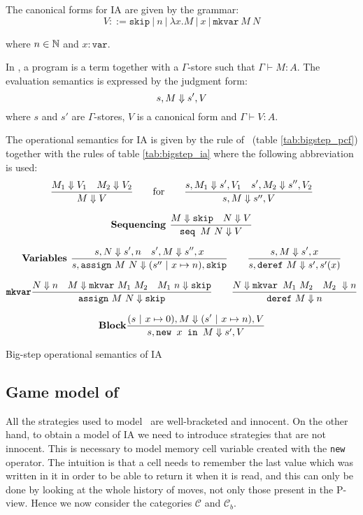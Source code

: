 The canonical forms for IA are given by the grammar:
$$ V ::= \texttt{skip}\ |\ n\ |\ \lambda x. M\ |\ x\ |\  \texttt{mkvar}\ M\ N$$

where $n \in \mathbb{N}$ and $x: \texttt{var}$.


In \ialgol, a program is a term together with a $\Gamma$-store such
that $\Gamma \vdash M : A$. The evaluation semantics is expressed by
the judgment form:
$$s,M \Downarrow s', V$$
where $s$ and $s'$ are $\Gamma$-stores, $V$ is a canonical form and $\Gamma \vdash V : A$.

The operational semantics for IA is given by the rule of \pcf\ (table \ref{tab:bigstep_pcf})
together with the rules of table \ref{tab:bigstep_ia} where the following abbreviation is used:
$$ \frac{\displaystyle M_1 \Downarrow V_1 \quad M_2 \Downarrow V_2}{M \Downarrow V} \qquad \mbox{for} \qquad
  \frac{\displaystyle s,M_1 \Downarrow s',V_1 \quad s', M_2 \Downarrow s'',V_2 }{s,M \Downarrow s'',V}
$$


\begin{table}[htbp]
$$\mbox{\textbf{Sequencing }}
    \frac{\displaystyle M \Downarrow \texttt{skip} \quad N \Downarrow V}{\texttt{seq } M\ N \Downarrow V}
$$

$$\mbox{\textbf{Variables }}
    \frac{\displaystyle s,N \Downarrow s',n \quad s',M \Downarrow s'',x}{s, \texttt{assign}\ M\ N \Downarrow (s''\ |\ x \mapsto n),\texttt{skip}}
\qquad
    \frac{\displaystyle s,M \Downarrow s',x }{s, \texttt{deref}\ M \Downarrow s',s'(x)}$$

$$\mbox{\texttt{\textbf{mkvar}}}
    \frac{\displaystyle N \Downarrow n \quad M \Downarrow \texttt{mkvar}\ M_1\ M_2 \quad M_1\ n \Downarrow \texttt{skip}}{\texttt{assign}\ M\ N \Downarrow \texttt{skip}}
\qquad
    \frac{\displaystyle N \Downarrow \texttt{mkvar } M_1\ M_2 \quad M_2\ \Downarrow n}{\texttt{deref}\ M \Downarrow n}
$$

$$\mbox{\textbf{Block}}
    \frac{\displaystyle (s\ |\ x \mapsto 0),M \Downarrow (s'\ |\ x \mapsto n),V }{s, \texttt{new } x \texttt{ in } M \Downarrow s',V}
$$

\label{tab:bigstep_ia}
\caption{Big-step operational semantics of IA}
\end{table}


\subsection{Game model of \ialgol}

All the strategies used to model \pcf\ are well-bracketed and
innocent. On the other hand, to obtain a model of IA we need to
introduce strategies that are not innocent. This is necessary to
model memory cell variable created with the \texttt{new} operator.
The intuition is that a cell needs to remember the last value which
was written in it in order to be able to return it when it is read,
and this can only be done by looking at the whole history of moves,
not only those present in the P-view. Hence we now consider the
categories $\mathcal{C}$ and $\mathcal{C}_b$.


